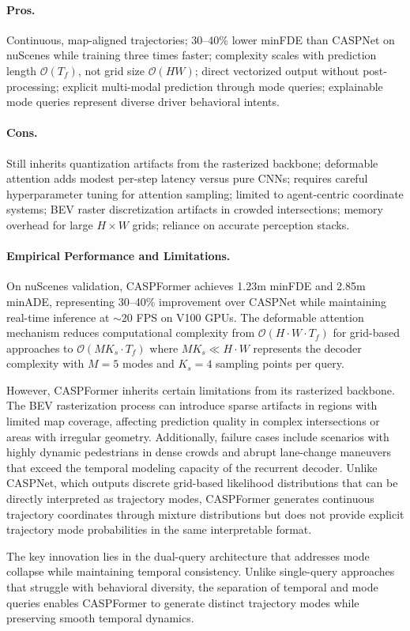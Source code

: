 \begin{description}[leftmargin=1em,itemsep=2pt]
\paragraph{Pros.} Continuous, map-aligned trajectories; 30–40\% lower minFDE than CASPNet on nuScenes while training three times faster; complexity scales with prediction length \(\mathcal{O}(T_f)\), not grid size \(\mathcal{O}(HW)\); direct vectorized output without post-processing; explicit multi-modal prediction through mode queries; explainable mode queries represent diverse driver behavioral intents.\\
\paragraph{Cons.} Still inherits quantization artifacts from the rasterized backbone; deformable attention adds modest per-step latency versus pure CNNs; requires careful hyperparameter tuning for attention sampling; limited to agent-centric coordinate systems; BEV raster discretization artifacts in crowded intersections; memory overhead for large \(H \times W\) grids; reliance on accurate perception stacks.
\end{description}

\paragraph{Empirical Performance and Limitations.} On nuScenes validation, CASPFormer achieves 1.23m minFDE and 2.85m minADE, representing 30--40\% improvement over CASPNet while maintaining real-time inference at \(\sim\)20 FPS on V100 GPUs. The deformable attention mechanism reduces computational complexity from \(\mathcal{O}(H \cdot W \cdot T_f)\) for grid-based approaches to \(\mathcal{O}(M K_s \cdot T_f)\) where \(M K_s \ll H \cdot W\) represents the decoder complexity with \(M = 5\) modes and \(K_s = 4\) sampling points per query.

However, CASPFormer inherits certain limitations from its rasterized backbone. The BEV rasterization process can introduce sparse artifacts in regions with limited map coverage, affecting prediction quality in complex intersections or areas with irregular geometry. Additionally, failure cases include scenarios with highly dynamic pedestrians in dense crowds and abrupt lane-change maneuvers that exceed the temporal modeling capacity of the recurrent decoder. Unlike CASPNet, which outputs discrete grid-based likelihood distributions that can be directly interpreted as trajectory modes, CASPFormer generates continuous trajectory coordinates through mixture distributions but does not provide explicit trajectory mode probabilities in the same interpretable format.

The key innovation lies in the dual-query architecture that addresses mode collapse while maintaining temporal consistency. Unlike single-query approaches that struggle with behavioral diversity, the separation of temporal and mode queries enables CASPFormer to generate distinct trajectory modes while preserving smooth temporal dynamics.

\newpage